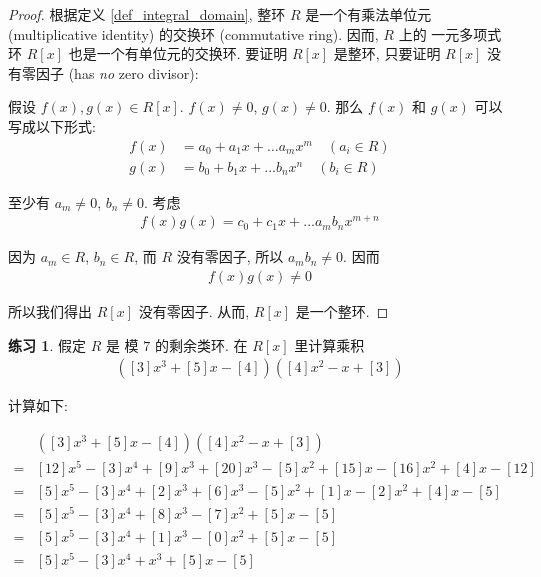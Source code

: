 \documentclass[utf8]{ctexbook}
\theoremstyle{definition}
\newtheorem{exercise}{练习}[section]
\begin{document}
\begin{proof}
根据定义 \ref{def_integral_domain}, 整环 $R$ 是一个有乘法单位元 (multiplicative identity) 的交换环 (commutative ring). 因而, $R$ 上的 一元多项式环 $R[x]$ 也是一个有单位元的交换环. 要证明 $R[x]$ 是整环, 只要证明 $R[x]$ 没有零因子 (has \emph{no} zero divisor):

假设 $f(x) , g(x) \in R[x]$. $f(x) \neq 0$, $g(x) \neq 0$. 那么 $f(x)$ 和 $g(x)$ 可以写成以下形式:
\begin{align*}
f(x) &= a_0 + a_1 x + \ldots a_m x^m \quad (a_i \in R) \\
g(x) &= b_0 + b_1 x + \ldots b_n x^n \quad (b_i \in R)
\end{align*}

至少有 $a_m \neq 0$, $b_n \neq 0$.  考虑
\begin{align*}
f(x) g(x) = c_0 + c_1 x + \ldots a_m b_n x^{m+n} 
\end{align*}

因为 $a_m \in R$, $b_n \in R$, 而 $R$ 没有零因子, 所以 $a_m b_n \neq 0 $. 因而 
\begin{align*}
f(x) g(x) \neq 0
\end{align*} 

所以我们得出 $R[x]$ 没有零因子. 从而,  $R[x]$ 是一个整环.

\end{proof}

\begin{exercise}
假定  $R$ 是 模 $7$ 的剩余类环. 在 $R[x]$ 里计算乘积
\begin{align*}
( [3] x^3 + [5] x - [4] )( [4] x^2 - x + [3] )
\end{align*}

计算如下:

\begin{align*}
& ( [3] x^3 + [5] x - [4] )( [4] x^2 - x + [3] ) \\
= & [12] x^5 - [3] x^4 + [9] x^3 + [20] x^3 - [5] x^2 + [15] x - [16] x^2 + [4] x - [12] \\
= & [5] x^5 - [3] x^4 + [2] x^3 + [6] x^3 - [5] x^2 + [1] x - [2] x^2 + [4] x - [5] \\
= & [5] x^5 - [3] x^4 + [8] x^3 - [7] x^2 + [5] x  - [5] \\
= & [5] x^5 - [3] x^4 + [1] x^3 - [0] x^2 + [5] x  - [5] \\
= & [5] x^5 - [3] x^4 + x^3 + [5] x  - [5]
\end{align*}

\end{exercise}
\end{document}

